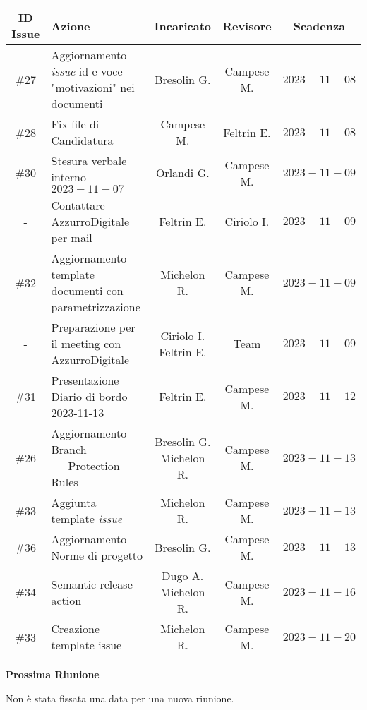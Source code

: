 \documentclass[10pt, a4paper]{article}
\begin{document}
{\renewcommand{\arraystretch}{1.5}
\begin{tabularx}{\textwidth}{c|X|c|c|c}
\textbf{ID Issue} & \textbf{Azione} & \textbf{Incaricato} & \textbf{Revisore} & \textbf{Scadenza} \\
\hline 
\#27 & Aggiornamento \textit{issue} id e voce "motivazioni" nei documenti  & Bresolin G. & Campese M. & $2023-11-08$ \\
\hline
\#28 & Fix file di Candidatura & Campese M. & Feltrin E. & $2023-11-08$ \\
\hline
\#30 & Stesura verbale interno $2023-11-07$ & Orlandi G. & Campese M. & $2023-11-09$ \\
\hline 
- & Contattare AzzurroDigitale per mail & Feltrin E. & Ciriolo I. & $2023-11-09$ \\
\hline
\#32 & Aggiornamento template documenti con parametrizzazione  &  Michelon R. & Campese M. & $2023-11-09$ \\
\hline
- & Preparazione per il meeting con AzzurroDigitale  & \quantities{Ciriolo I.\\Feltrin E.} & Team & $2023-11-09$ \\
\hline
\#31 & Presentazione Diario di bordo 2023-11-13 & Feltrin E. & Campese M. & $2023-11-12$ \\
\hline
\#26 & Aggiornamento Branch \ \ \  Protection Rules & \quantities{Bresolin G. \\Michelon R.} & Campese M. & $2023-11-13$ \\
\hline
\#33 & Aggiunta template \textit{issue} & Michelon R. & Campese M. & $2023-11-13$ \\
\hline
\#36 & Aggiornamento Norme di progetto & Bresolin G. & Campese M. & $2023-11-13$ \\
\hline
\#34 & Semantic-release action & \quantities{Dugo A. \\ Michelon R.} & Campese M. & $2023-11-16$ \\
\hline
\#33 & Creazione template issue & Michelon R. & Campese M. & $2023-11-20$\\
\end{tabularx}}



\vspace{3em}


\textbf{Prossima Riunione}

Non è stata fissata una data per una nuova riunione.
\end{document}
